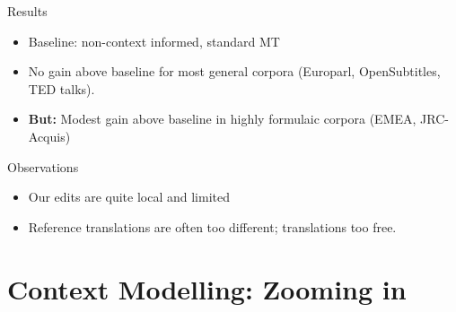 \documentclass[compress]{beamer}
\begin{document}
\begin{frame}


  \begin{block}{Results}

    \begin{itemize}
      \item Baseline: non-context informed, standard MT
      \item No gain above baseline for most general corpora
        (Europarl, OpenSubtitles, TED talks).
      \item \textbf{But:} Modest gain above baseline in highly formulaic
        corpora (EMEA, JRC-Acquis)
    \end{itemize}

  \end{block}
\end{frame}


\begin{frame}

  \begin{block}{Observations}
    \begin{itemize}
      \item Our edits are quite local and limited
      \item Reference translations are often too different; translations too
        free.
    \end{itemize}
  \end{block}

\end{frame}


\section{Context Modelling: Zooming in}
\end{document}
